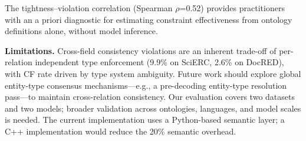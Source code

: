 \documentclass[11pt,a4paper]{article}
\begin{document}
The tightness--violation correlation (Spearman $\rho$=0.52) provides practitioners with an a priori diagnostic for estimating constraint effectiveness from ontology definitions alone, without model inference.

\textbf{Limitations.}
Cross-field consistency violations are an inherent trade-off of per-relation independent type enforcement (9.9\% on SciERC, 2.6\% on DocRED), with CF rate driven by type system ambiguity.
Future work should explore global entity-type consensus mechanisms---e.g., a pre-decoding entity-type resolution pass---to maintain cross-relation consistency.
Our evaluation covers two datasets and two models; broader validation across ontologies, languages, and model scales is needed.
The current implementation uses a Python-based semantic layer; a C++ implementation would reduce the 20\% semantic overhead.


\end{document}
